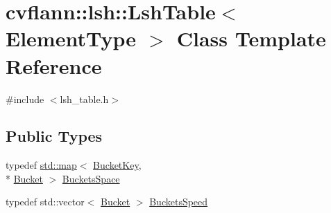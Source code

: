 \hypertarget{classcvflann_1_1lsh_1_1LshTable}{\section{cvflann\-:\-:lsh\-:\-:Lsh\-Table$<$ Element\-Type $>$ Class Template Reference}
\label{classcvflann_1_1lsh_1_1LshTable}
}


{\ttfamily \#include $<$lsh\-\_\-table.\-h$>$}

\subsection*{Public Types}
\begin{DoxyCompactItemize}
\item 
typedef \hyperlink{core__c_8h_a035af1d430a8c9a1d115cbfb6c8e25dc}{std\-::map}$<$ \hyperlink{namespacecvflann_1_1lsh_a798313f0f282f24b311c4cc90e2a6619}{Bucket\-Key}, \\*
\hyperlink{namespacecvflann_1_1lsh_aef9e4f70918d6013ff72020141fa03d0}{Bucket} $>$ \hyperlink{classcvflann_1_1lsh_1_1LshTable_aaec536a20e7ed000f05966d33fba1c3a}{Buckets\-Space}
\item 
typedef std\-::vector$<$ \hyperlink{namespacecvflann_1_1lsh_aef9e4f70918d6013ff72020141fa03d0}{Bucket} $>$ \hyperlink{classcvflann_1_1lsh_1_1LshTable_a5158c2837006305fa506668d12050d67}{Buckets\-Speed}
\end{DoxyCompactItemize}
